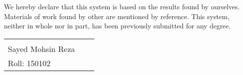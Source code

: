 We hereby declare that this system is based on the results found by ourselves. Materials of work found by other are mentioned by reference. This system, neither in whole nor in part, has been previously submitted for any degree.

\bigskip
\bigskip
\bigskip


\begin{tabular}{p{5cm}p{5cm}p{5cm}}
\centering
     &  &   \\
  Sayed  Mohsin  Reza &   & \\
  Roll: 150102 &    & \\

\end{tabular}




